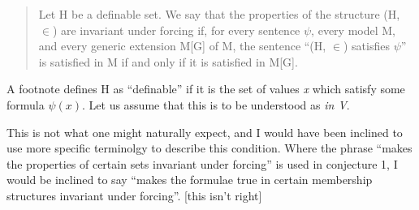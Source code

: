 \begin{quote}
Let H be a definable set.
We say that the properties of the structure (H, $\in$) are invariant under forcing if, for every sentence $\psi$, every model M, and every generic extension M[G] of M, the sentence ``(H, $\in$) satisfies $\psi$'' is satisfied in M if and only if it is satisfied in M[G].
\end{quote}

A footnote defines H as ``definable'' if it is the set of values \emph{x} which satisfy some formula $\psi(x)$. 
Let us assume that this is to be understood as \emph{in V}.

This is not what one might naturally expect, and I would have been inclined to use more specific terminolgy to describe this condition.
Where the phrase ``makes the properties of certain sets invariant under forcing'' is used in conjecture 1, I would be inclined to say ``makes the formulae true in certain membership structures invariant under forcing''. 
[this isn't right]


